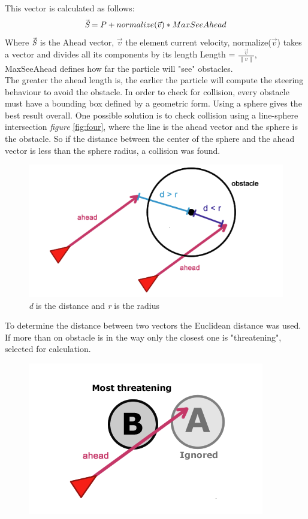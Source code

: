 This vector is calculated as follows:
\begin{equation}
\vec{\emph{S}} = P + normalize(\vec{v}) * MaxSeeAhead
\end{equation}
Where $\vec{\emph{S}}$ is the Ahead vector, $\vec{v}$ the element current velocity, normalize($\vec{v}$) takes a vector and divides all its components by its length Length = $\frac{\vec{v}}{\lVert v \rVert}$, MaxSeeAhead defines how far the particle will "see" obstacles.\\
The greater the ahead length is, the earlier the particle will compute the steering behaviour to avoid the obstacle.
In order to check for collision, every obstacle must have a bounding box defined by a geometric form. Using a sphere gives the best result overall. One possible solution is to check collision using a line-sphere intersection \emph{figure} \ref{fig:four}, where the line is the ahead vector and the sphere is the obstacle. So if the distance between the center of the sphere and the ahead vector is less than the sphere radius, a collision was found.
\begin{figure}
 	\includegraphics{collision}
 	\caption{\emph{d} is the distance and \emph{r} is the radius}
 	\label{fig:six}
\end{figure}
To determine the distance between two vectors the Euclidean distance was used. If more than on obstacle is in the way only the closest one is "threatening", selected for calculation.
\begin{figure}
	\includegraphics{Threat}
	\caption{}
	\label{fig:seven}
\end{figure}

